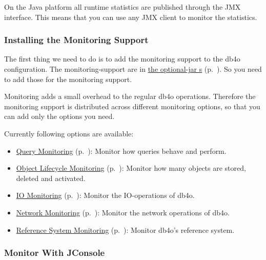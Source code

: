 On the Java platform all runtime statistics are published through the JMX interface. This means that you can use any JMX client to monitor the statistics.

\subsubsection*{Installing the Monitoring Support}

The first thing we need to do is to add the monitoring support to the db4o configuration. The monitoring-support are in \hyperref[ref:dependency-overview]{the optional-jar s} (p.~\pageref{ref:dependency-overview}). So you need to add those for the monitoring support.

Monitoring adds a small overhead to the regular db4o operations. Therefore the monitoring support is distributed across different monitoring options, so that you can add only the options you need.

Currently following options are available:

\begin{itemize}
\item \hyperref[ref:advanced-topics-runtime-statistics-monitor-queries]{Query Monitoring} (p.~\pageref{ref:advanced-topics-runtime-statistics-monitor-queries}): Monitor how queries behave and perform.
\item \hyperref[ref:advanced-topics-runtime-statistics-monitor-object-lifecycle]{Object Lifecycle Monitoring} (p.~\pageref{ref:advanced-topics-runtime-statistics-monitor-object-lifecycle}): Monitor how many objects are stored, deleted and activated.
\item \hyperref[ref:advanced-topics-runtime-statistics-monitor-io]{IO Monitoring} (p.~\pageref{ref:advanced-topics-runtime-statistics-monitor-io}): Monitor the IO-operations of db4o.
\item \hyperref[ref:advanced-topics-runtime-statistics-monitor-network]{Network Monitoring} (p.~\pageref{ref:advanced-topics-runtime-statistics-monitor-network}): Monitor the network operations of db4o.
\item \hyperref[ref:advanced-topics-runtime-statistics-monitor-reference-system]{Reference System Monitoring} (p.~\pageref{ref:advanced-topics-runtime-statistics-monitor-reference-system}): Monitor db4o's reference system.
\end{itemize}

\subsubsection*{Monitor With JConsole}

